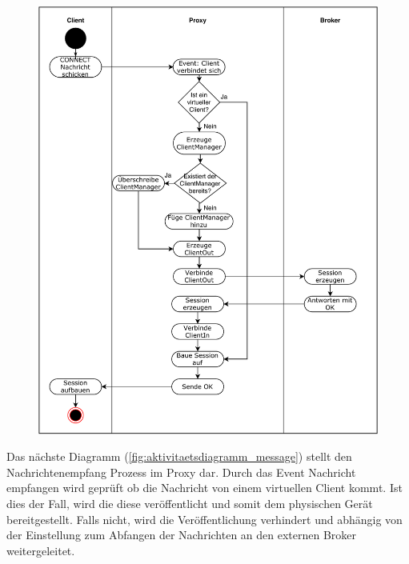     \begin{figure}[!h]%
        \centering
        \includegraphics[width=14cm]{tex/bilder/4_konzept/Activity_Connect.pdf}
        \label{fig:aktivitaetsdiagramm_connect}
    \end{figure}
    \newpage
    Das nächste Diagramm (\ref{fig:aktivitaetsdiagramm_message}) stellt den Nachrichtenempfang Prozess im Proxy dar.
    Durch das Event \glqq Nachricht empfangen\grqq{} wird geprüft ob die Nachricht von einem virtuellen Client kommt. Ist dies der Fall, wird die diese veröffentlicht und somit dem physischen Gerät bereitgestellt. Falls nicht, wird die Veröffentlichung verhindert und abhängig von der Einstellung zum Abfangen der Nachrichten an den externen Broker weitergeleitet.
    
